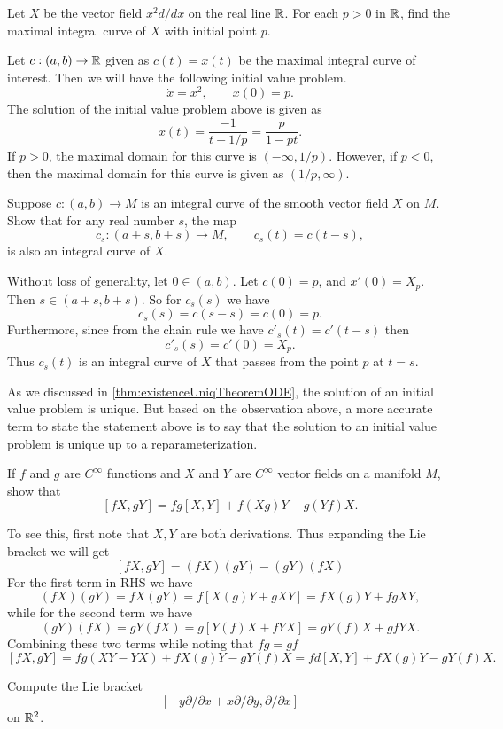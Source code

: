 \begin{problem}
	Let $ X $ be the vector field $ x^2 d/dx $ on the real line $ \mathbb{R} $. For each $ p > 0 $ in $ \mathbb{R} $, find the maximal integral curve of $ X $ with initial point $ p $.
\end{problem}
\begin{solution}
	Let $ c: (a,b) \to \mathbb{R}$ given as $ c(t) = x(t) $ be the maximal integral curve of interest. Then we will have the following initial value problem.
	\[ \dot{x} = x^2, \qquad x(0) = p. \]
	The solution of the initial value problem above is given as 
	\[ x(t) = \frac{-1}{t - 1/p} = \frac{p}{1-pt}.  \]
	If $ p > 0 $, the maximal domain for this curve is $ (-\infty, 1/p) $. However, if $ p < 0 $, then the maximal domain for this curve is given as $ (1/p,\infty) $.
\end{solution}

\begin{problem}
	Suppose $ c: (a,b) \to M $ is an integral curve of the smooth vector field $ X $ on $ M $. Show that for any real number $ s $, the map
	\[ c_s: (a+s,b+s) \to M, \qquad c_s(t) = c(t-s), \] 
	is also an integral curve of $ X $.
\end{problem}
\begin{solution}
	Without loss of generality, let $ 0 \in (a,b) $. Let $ c(0) = p $, and $ x'(0) = X_p $. Then $ s \in (a+s, b+s) $. So for $ c_s(s) $ we have
	\[ c_s(s) = c(s-s) = c(0) = p. \]
	Furthermore, since from the chain rule we have $ c'_s(t) = c'(t-s) $ then 
	\[ c'_s(s) = c'(0) = X_p. \]
	Thus $ c_s(t) $ is an integral curve of $ X $ that passes from the point $ p $ at $ t = s $.
	\begin{observation}
		As we discussed in \autoref{thm:existenceUniqTheoremODE}, the solution of an initial value problem is unique. But based on the observation above, a more accurate term to state the statement above is to say that the solution to an initial value problem is unique up to a reparameterization.
	\end{observation}
\end{solution}

\begin{problem}
	If $ f $ and $ g $ are $ C^\infty $ functions and $ X $ and $ Y $ are $ C^\infty $ vector fields on a manifold $ M $, show that 
	\[ [fX, gY] = fg[X,Y] + f(Xg)Y - g(Yf)X. \]
\end{problem}
\begin{solution}
	To see this, first note that $ X,Y $ are both derivations. Thus expanding the Lie bracket we will get
	\[ [fX,gY] = (fX)(gY) - (gY)(fX) \]
	For the first term in RHS we have
	\[ (fX)(gY) = fX(gY) = f[X(g)Y + gXY] = fX(g)Y + fg XY, \]
	while for the second term we have
	\[ (gY)(fX) = gY(fX) = g[Y(f)X + fYX] = gY(f)X + gf YX. \]
	Combining these two terms while noting that $ fg = gf $
	\[ [fX,gY] = fg (XY - YX) + fX(g)Y - gY(f)X = fd[X,Y] + fX(g)Y - gY(f)X. \]
\end{solution}

\begin{problem}
	Compute the Lie bracket 
	\[ [-y\partial/\partial x + x\partial/\partial y, \partial/\partial x] \]
	on $ \mathbb{R}^2 $.
\end{problem}
